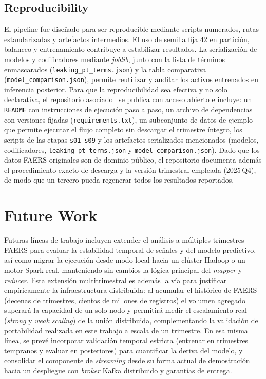 \documentclass[12pt,a4paper]{article}
\begin{document}
\subsection{Reproducibility}
El pipeline fue diseñado para ser reproducible mediante scripts numerados, rutas estandarizadas y artefactos intermedios. El uso de semilla fija 42 en partición, balanceo y entrenamiento contribuye a estabilizar resultados. La serialización de modelos y codificadores mediante \textit{joblib}, junto con la lista de términos enmascarados (\texttt{leaking\_pt\_terms.json}) y la tabla comparativa (\texttt{model\_comparison.json}), permite reutilizar y auditar los activos entrenados en inferencia posterior. Para que la reproducibilidad sea efectiva y no solo declarativa, el repositorio asociado~\cite{repoFaers} se publica con acceso abierto e incluye: un \texttt{README} con instrucciones de ejecución paso a paso, un archivo de dependencias con versiones fijadas (\texttt{requirements.txt}), un subconjunto de datos de ejemplo que permite ejecutar el flujo completo sin descargar el trimestre íntegro, los scripts de las etapas \texttt{s01}--\texttt{s09} y los artefactos serializados mencionados (modelos, codificadores, \texttt{leaking\_pt\_terms.json} y \texttt{model\_comparison.json}). Dado que los datos FAERS originales son de dominio público, el repositorio documenta además el procedimiento exacto de descarga y la versión trimestral empleada (2025\,Q4), de modo que un tercero pueda regenerar todos los resultados reportados.

\section{Future Work}
\label{sec:future}
Futuras líneas de trabajo incluyen extender el análisis a múltiples trimestres FAERS para evaluar la estabilidad temporal de señales y del modelo predictivo, así como migrar la ejecución desde modo local hacia un clúster Hadoop o un motor Spark real, manteniendo sin cambios la lógica principal del \textit{mapper} y \textit{reducer}. Esta extensión multitrimestral es además la vía para justificar empíricamente la infraestructura distribuida: al acumular el histórico de FAERS (decenas de trimestres, cientos de millones de registros) el volumen agregado superará la capacidad de un solo nodo y permitirá medir el escalamiento real (\textit{strong} y \textit{weak scaling}) de la unión distribuida, complementando la validación de portabilidad realizada en este trabajo a escala de un trimestre. En esa misma línea, se prevé incorporar validación temporal estricta (entrenar en trimestres tempranos y evaluar en posteriores) para cuantificar la deriva del modelo, y consolidar el componente de \textit{streaming} desde su forma actual de demostración hacia un despliegue con \textit{broker} Kafka distribuido y garantías de entrega.
\end{document}
